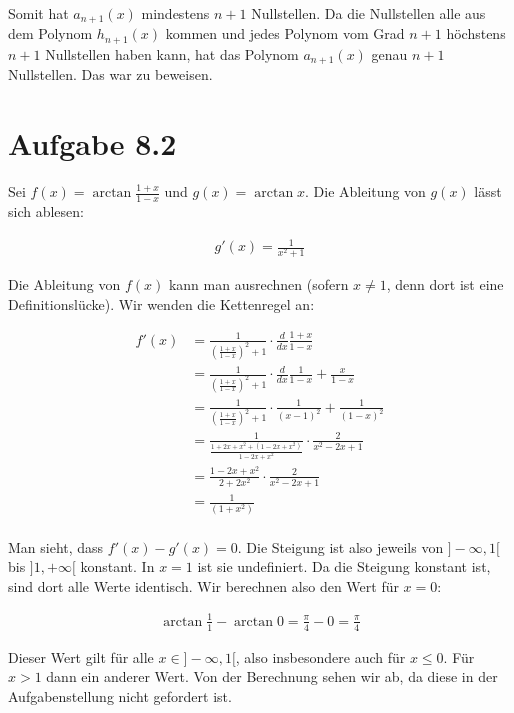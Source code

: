 \documentclass[a4paper,german,12pt,smallheadings]{scrartcl}
\begin{document}
Somit hat $a_{n+1}(x)$ mindestens $n+1$ Nullstellen. Da die Nullstellen alle
aus dem Polynom $h_{n+1}(x)$ kommen und jedes Polynom vom Grad $n+1$ höchstens
$n+1$ Nullstellen haben kann, hat das Polynom $a_{n+1}(x)$ genau $n+1$
Nullstellen. Das war zu beweisen.

\section*{Aufgabe 8.2}
Sei $f(x) = \arctan \frac{1+x}{1-x}$ und $g(x) = \arctan x$. Die Ableitung von
$g(x)$ lässt sich ablesen:

\begin{align*}
  g'(x) = \frac{1}{x^2+1}
\end{align*}

Die Ableitung von $f(x)$ kann man ausrechnen (sofern $x \neq 1$, denn dort ist
eine Definitionslücke). Wir wenden die Kettenregel an:

\begin{align*}
  f'(x) &= \frac{1}{\left(\frac{1+x}{1-x}\right)^2+1} \cdot \frac{d}{dx} \frac{1+x}{1-x} \\
        &= \frac{1}{\left(\frac{1+x}{1-x}\right)^2+1} \cdot \frac{d}{dx} \frac{1}{1-x} + \frac{x}{1-x} \\
        &= \frac{1}{\left(\frac{1+x}{1-x}\right)^2+1} \cdot \frac{1}{(x-1)^2} + \frac{1}{(1-x)^2} \\
        &= \frac{1}{\frac{1+2x+x^2+(1-2x+x^2)}{1-2x+x^2}} \cdot \frac{2}{x^2-2x+1} \\
        &= \frac{1-2x+x^2}{2+2x^2} \cdot \frac{2}{x^2-2x+1} \\
        &= \frac{1}{(1+x^2)} \\
\end{align*}

Man sieht, dass $f'(x) - g'(x) = 0$. Die Steigung ist also jeweils von
$]-\infty, 1[$ bis $]1, +\infty[$ konstant. In $x = 1$ ist sie undefiniert. Da
die Steigung konstant ist, sind dort alle Werte identisch. Wir berechnen also
den Wert für $x=0$:

\begin{align*}
  \arctan \frac{1}{1} - \arctan 0 = \frac{\pi}{4} - 0 = \frac{\pi}{4}
\end{align*}

Dieser Wert gilt für alle $x \in ]-\infty, 1[$, also insbesondere auch für $x
\leq 0$. Für $x > 1$ dann ein anderer Wert. Von der Berechnung sehen wir ab, da
diese in der Aufgabenstellung nicht gefordert ist.
\end{document}
